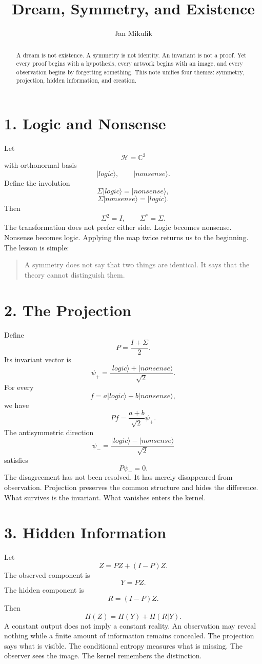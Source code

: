 \documentclass[12pt]{article}
\title{Dream, Symmetry, and Existence}
\author{Jan Mikulík}
\date{}
\begin{document}
\maketitle
\begin{abstract}
A dream is not existence. A symmetry is not identity. An invariant is not a proof. Yet every proof begins with a hypothesis, every artwork begins with an image, and every observation begins by forgetting something. This note unifies four themes: symmetry, projection, hidden information, and creation.
\end{abstract}
\section*{1. Logic and Nonsense}
Let
\[
\mathcal H=\mathbb C^2
\]
with orthonormal basis
\[
|logic\rangle,\qquad |nonsense\rangle.
\]
Define the involution
\[
\Sigma|logic\rangle=|nonsense\rangle,
\]
\[
\Sigma|nonsense\rangle=|logic\rangle.
\]
Then
\[
\Sigma^2=I, \qquad \Sigma^*=\Sigma.
\]
The transformation does not prefer either side. Logic becomes nonsense. Nonsense becomes logic. Applying the map twice returns us to the beginning. The lesson is simple:
\begin{quote}
A symmetry does not say that two things are identical. It says that the theory cannot distinguish them.
\end{quote}
\section*{2. The Projection}
Define
\[
P=\frac{I+\Sigma}{2}.
\]
Its invariant vector is
\[
\psi_+ = \frac{|logic\rangle+|nonsense\rangle}{\sqrt2}.
\]
For every
\[
f=a|logic\rangle+b|nonsense\rangle,
\]
we have
\[
Pf = \frac{a+b}{\sqrt2}\psi_+.
\]
The antisymmetric direction
\[
\psi_- = \frac{|logic\rangle-|nonsense\rangle}{\sqrt2}
\]
satisfies
\[
P\psi_-=0.
\]
The disagreement has not been resolved. It has merely disappeared from observation. Projection preserves the common structure and hides the difference. What survives is the invariant. What vanishes enters the kernel.
\section*{3. Hidden Information}
Let
\[
Z=PZ+(I-P)Z.
\]
The observed component is
\[
Y=PZ.
\]
The hidden component is
\[
R=(I-P)Z.
\]
Then
\[
H(Z) = H(Y) + H(R|Y).
\]
A constant output does not imply a constant reality. An observation may reveal nothing while a finite amount of information remains concealed. The projection says what is visible. The conditional entropy measures what is missing. The observer sees the image. The kernel remembers the distinction.
\end{document}
